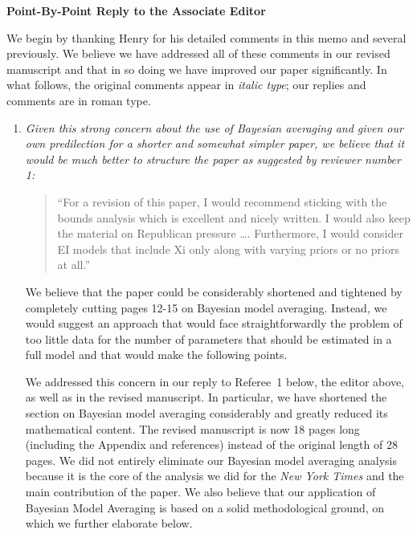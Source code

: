 \documentclass[11pt]{article}
\begin{document}
\clearpage
\begin{center}
  {\bf \Large Point-By-Point Reply to the Associate Editor}
\end{center}

We begin by thanking Henry for his detailed comments in this memo and
several previously.  We believe we have addressed all of these
comments in our revised manuscript and that in so doing we have
improved our paper significantly.  In what follows, the original
comments appear in \emph{italic type}; our replies and comments are in
roman type.

\bigskip
{}

\begin{enumerate}
  
\item {\it Given this strong concern about the use of Bayesian
    averaging and given our own predilection for a shorter and
    somewhat simpler paper, we believe that it would be much better to
    structure the paper as suggested by reviewer number 1:
    \begin{quote}
      ``For a revision of this paper, I would recommend sticking with
      the bounds analysis which is excellent and nicely written.  I
      would also keep the material on Republican pressure \ldots.
      Furthermore, I would consider EI models that include Xi only along
      with varying priors or no priors at all.''
    \end{quote}
    We believe that the paper could be considerably shortened and
    tightened by completely cutting pages 12-15 on Bayesian model
    averaging.  Instead, we would suggest an approach that would face
    straightforwardly the problem of too little data for the number of
    parameters that should be estimated in a full model and that would
    make the following points.}
  
  We addressed this concern in our reply to Referee~1 below, the
  editor above, as well as in the revised manuscript.  In particular,
  we have shortened the section on Bayesian model averaging
  considerably and greatly reduced its mathematical content.  The
  revised manuscript is now 18 pages long (including the Appendix and
  references) instead of the original length of 28 pages. We did not
  entirely eliminate our Bayesian model averaging analysis because it
  is the core of the analysis we did for the {\it New York Times} and
  the main contribution of the paper.  We also believe that our
  application of Bayesian Model Averaging is based on a solid
  methodological ground, on which we further elaborate below.
  

\end{enumerate}
\end{document}
